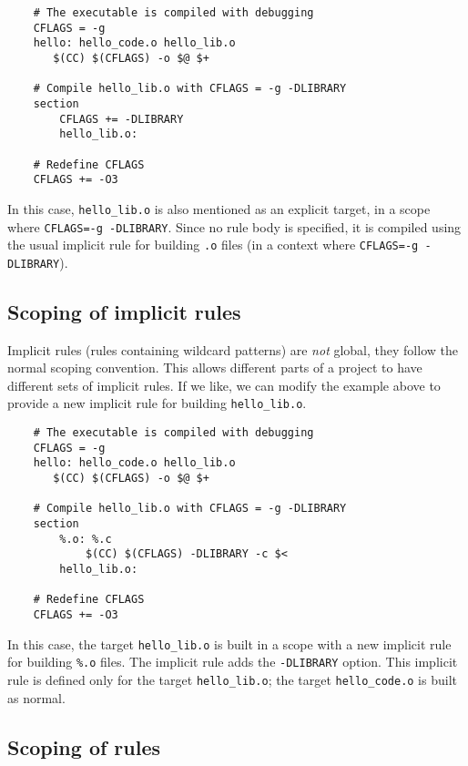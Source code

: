\begin{verbatim}
    # The executable is compiled with debugging
    CFLAGS = -g
    hello: hello_code.o hello_lib.o
       $(CC) $(CFLAGS) -o $@ $+

    # Compile hello_lib.o with CFLAGS = -g -DLIBRARY
    section
        CFLAGS += -DLIBRARY
        hello_lib.o:

    # Redefine CFLAGS
    CFLAGS += -O3
\end{verbatim}

In this case, \verb+hello_lib.o+ is also mentioned as an explicit target, in a scope where
\verb+CFLAGS=-g -DLIBRARY+.  Since no rule body is specified, it is compiled using the usual
implicit rule for building \verb+.o+ files (in a context where \verb+CFLAGS=-g -DLIBRARY+).

\subsection{Scoping of implicit rules}
\label{section:implicit-scoping}

Implicit rules (rules containing wildcard patterns) are \emph{not} global, they follow the normal
scoping convention.  This allows different parts of a project to have different sets of implicit
rules.  If we like, we can modify the example above to provide a new implicit rule for building
\verb+hello_lib.o+.

\begin{verbatim}
    # The executable is compiled with debugging
    CFLAGS = -g
    hello: hello_code.o hello_lib.o
       $(CC) $(CFLAGS) -o $@ $+

    # Compile hello_lib.o with CFLAGS = -g -DLIBRARY
    section
        %.o: %.c
            $(CC) $(CFLAGS) -DLIBRARY -c $<
        hello_lib.o:

    # Redefine CFLAGS
    CFLAGS += -O3
\end{verbatim}

In this case, the target \verb+hello_lib.o+ is built in a scope with a new implicit rule for
building \verb+%.o+ files.  The implicit rule adds the \verb+-DLIBRARY+ option.  This implicit rule
is defined only for the target \verb+hello_lib.o+; the target \verb+hello_code.o+ is built as
normal.

\subsection{Scoping of  rules}

